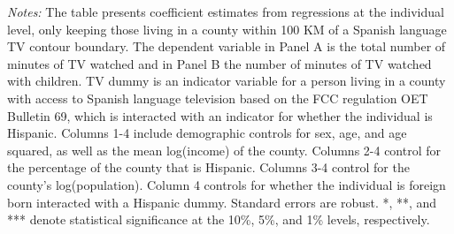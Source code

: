 \begin{table}[!htbp]
{\begin{threeparttable}
\begin{tablenotes}[flushleft]
				\item \textit{Notes:} The table presents coefficient estimates from regressions at the individual level, only keeping those living in a county within 100 KM of a Spanish language TV contour boundary. The dependent variable in Panel A is the total number of minutes of TV watched and in Panel B the number of minutes of TV watched with children. TV dummy is an indicator variable for a person living in a county with access to Spanish language television based on the FCC regulation OET Bulletin 69, which is interacted with an indicator for whether the individual is Hispanic. Columns 1-4 include demographic controls for sex, age, and age squared, as well as the mean log(income) of the county. Columns 2-4 control for the percentage of the county that is Hispanic. Columns 3-4 control for the county's log(population). Column 4 controls for whether the individual is foreign born interacted with a Hispanic dummy. Standard errors are robust. *, **, and *** denote statistical significance at the 10\%, 5\%, and 1\% levels, respectively.
			\end{tablenotes}
		\end{threeparttable}
	}
\end{table}